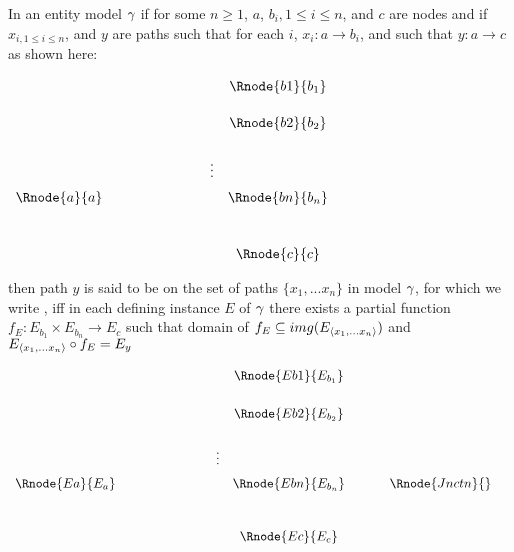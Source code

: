 \begin{definition} %
In an entity model $\gamma$  
if for some $n \geq 1$, $a$, $b_{i}, 1 \leq i \leq n$,  and $c$ are nodes and 
if  $x_{i, 1 \leq i \leq n}$, and $y$ are paths such
that for each $i$, $x_i : a \rightarrow b_i$, and such that $y: a \rightarrow c$ 
as shown here:
\setlength{\arraycolsep}{.2cm}
\begin{center}
$
\begin{array}{cp{2cm}cc}
             & &         & \Rnode{b1}{b_1} \\ [0.5cm]
						 & &         & \Rnode{b2}{b_2} \\ [0.6cm]
						 & & \vdots  &                 \\ [0.2cm]
\Rnode{a}{a} & &         & \Rnode{bn}{b_n} \\ [1.0cm]
             & &         & \Rnode{c}{c}   \\
\end{array}
$
\end{center}



\noindent 
then path $y$ is said to be  on the set of paths $\{x_1,...x_n\}$ in model $\gamma$, 
for which  we write  ,
iff
 in each defining instance $E$ of $\gamma$ there exists a  partial 
function $f_E: E_{b_1} \times E_{b_n} \rightarrow E_c$ 
\noindent such that 
domain of $f_E \subseteq img(E_{\langle x_1,... x_n \rangle})$ 
and  
$E_{\langle x_1,...x_n\rangle} \circ f_E = E_y$ 
\begin{center}
$
\begin{array}{cp{2cm}ccp{0.5cm}cc}
						    & &         & \Rnode{Eb1}{E_{b_1}}& &                            &        \\ [0.6cm]
						    & &         & \Rnode{Eb2}{E_{b_2}}& &                            &        \\ [0.6cm]
						    & &\vdots  &                      & &                            &        \\ [0.2cm]												
\Rnode{Ea}{E_a} & &         & \Rnode{Ebn}{E_{b_n}}& & \Rnode{Jnctn}{}&  \\ [1.0cm]
						    & &         & \Rnode{Ec}{{E_c}}   & &                            &        \\
\end{array}
$
\end{center}
\end{definition}

